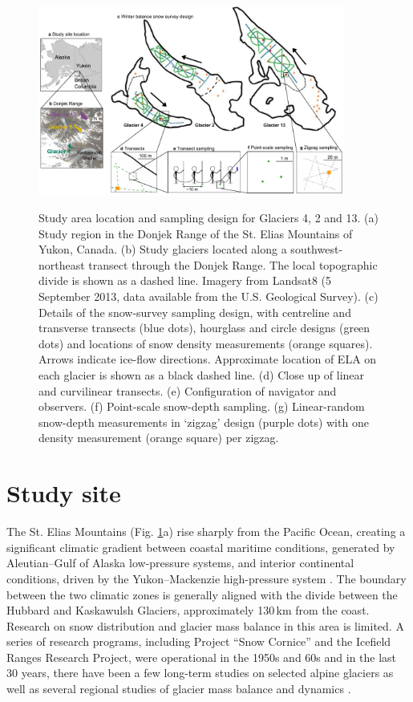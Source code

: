 \documentclass[twocolumn, letterpaper]{igs}
\begin{document}
\begin{figure}
	\centering
	\includegraphics[width =0.9\textwidth]{Sampling.pdf}\\
	\caption{Study area location and sampling design for Glaciers 4, 2 and 13. (a) Study region in the Donjek Range of the St. Elias Mountains of Yukon, Canada. (b) Study glaciers located along a southwest-northeast transect through the Donjek Range. The local topographic divide is shown as a dashed line. Imagery from Landsat8 (5 September 2013, data available from the U.S. Geological Survey). (c) Details of the snow-survey sampling design, with centreline and transverse transects (blue dots), hourglass and circle designs (green dots) and locations of snow density measurements (orange squares). Arrows indicate ice-flow directions. Approximate location of ELA on each glacier is shown as a black dashed line. (d) Close up of linear and curvilinear transects. (e) Configuration of navigator and observers. (f) Point-scale snow-depth sampling. (g) Linear-random snow-depth measurements in `zigzag' design (purple dots) with one density measurement (orange square) per zigzag.}
	\label{fig:Sampling}
\end{figure}

\section{Study site}

The St. Elias Mountains (Fig. \ref{fig:Sampling}a) rise sharply from the Pacific Ocean, creating a significant climatic gradient between coastal maritime conditions, generated by Aleutian--Gulf of Alaska low-pressure systems, and interior continental conditions, driven by the Yukon--Mackenzie high-pressure system \citep{Taylor1969}. The boundary between the two climatic zones is generally aligned with the divide between the Hubbard and Kaskawulsh Glaciers, approximately 130\,km from the coast. Research on snow distribution and glacier mass balance in this area is limited. A series of research programs, including Project ``Snow Cornice''  and the Icefield Ranges Research Project, were operational in the 1950s and 60s \citep{Wood1948, Danby2003} and in the last 30 years, there have been a few long-term studies on selected alpine glaciers \citep[e.g.][]{Clarke2014} as well as several regional studies of glacier mass balance and dynamics \citep[e.g.][]{Arendt2008, Burgess2013,Waechter2015}.
\end{document}
